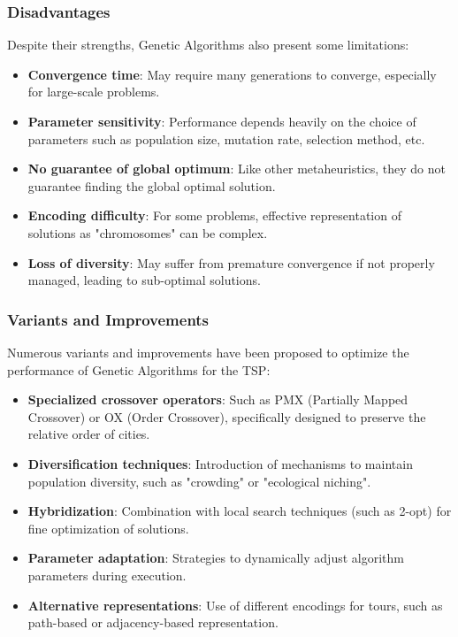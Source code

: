 \subsubsection{Disadvantages}

Despite their strengths, Genetic Algorithms also present some limitations:

\begin{itemize}
	\item \textbf{Convergence time}: May require many generations to converge, especially for large-scale problems.
	\item \textbf{Parameter sensitivity}: Performance depends heavily on the choice of parameters such as population size, mutation rate, selection method, etc.
	\item \textbf{No guarantee of global optimum}: Like other metaheuristics, they do not guarantee finding the global optimal solution.
	\item \textbf{Encoding difficulty}: For some problems, effective representation of solutions as "chromosomes" can be complex.
	\item \textbf{Loss of diversity}: May suffer from premature convergence if not properly managed, leading to sub-optimal solutions.
\end{itemize}

\subsubsection{Variants and Improvements}

Numerous variants and improvements have been proposed to optimize the performance of Genetic Algorithms for the \Gls{TSP}:

\begin{itemize}
	\item \textbf{Specialized crossover operators}: Such as \Gls{PMX} (Partially Mapped Crossover) or \Gls{OX} (Order Crossover), specifically designed to preserve the relative order of cities.
	\item \textbf{Diversification techniques}: Introduction of mechanisms to maintain population diversity, such as "crowding" or "ecological niching".
	\item \textbf{Hybridization}: Combination with local search techniques (such as 2-opt) for fine optimization of solutions.
	\item \textbf{Parameter adaptation}: Strategies to dynamically adjust algorithm parameters during execution.
	\item \textbf{Alternative representations}: Use of different encodings for tours, such as path-based or adjacency-based representation.
\end{itemize}


